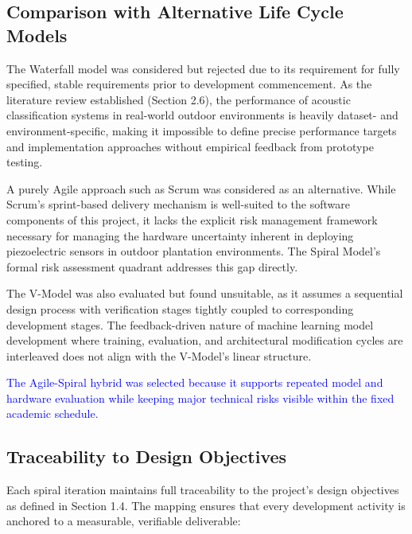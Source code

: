 \documentclass[12pt,a4paper,oneside]{memoir}
\newcommand{\earlierrevision}[1]{\textcolor{blue}{#1}}
\begin{document}
\subsection{Comparison with Alternative Life Cycle Models}

The Waterfall model was considered but rejected due to its requirement for fully specified, stable requirements prior to development commencement. As the literature review established (Section 2.6), the performance of acoustic classification systems in real-world outdoor environments is heavily dataset- and environment-specific, making it impossible to define precise performance targets and implementation approaches without empirical feedback from prototype testing.

A purely Agile approach such as Scrum was considered as an alternative. While Scrum's sprint-based delivery mechanism is well-suited to the software components of this project, it lacks the explicit risk management framework necessary for managing the hardware uncertainty inherent in deploying piezoelectric sensors in outdoor plantation environments. The Spiral Model's formal risk assessment quadrant addresses this gap directly.

The V-Model was also evaluated but found unsuitable, as it assumes a sequential design process with verification stages tightly coupled to corresponding development stages. The feedback-driven nature of machine learning model development where training, evaluation, and architectural modification cycles are interleaved does not align with the V-Model's linear structure.

\earlierrevision{The Agile-Spiral hybrid was selected because it supports repeated model and hardware evaluation while keeping major technical risks visible within the fixed academic schedule.}

\subsection{Traceability to Design Objectives}

Each spiral iteration maintains full traceability to the project's design objectives as defined in Section 1.4. The mapping ensures that every development activity is anchored to a measurable, verifiable deliverable:
\end{document}
